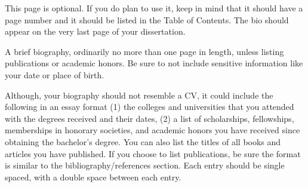 \biography
This page is optional. If you do plan to use it, keep in mind that it should have a page number and it should be listed in the Table of Contents. The bio should appear on the very last page of your dissertation.

A brief biography, ordinarily no more than one page in length, unless listing publications or academic honors.  Be sure to not include sensitive information like your date or place of birth.  

Although, your biography should not resemble a CV, it could include the following in an essay format  (1) the colleges and universities that you attended with the degrees received and their dates, (2) a list of scholarships, fellowships, memberships in honorary societies, and academic honors you have received since obtaining the bachelor’s degree.  You can also list the titles of all books and articles you have published.  If you choose to list publications, be sure the format is similar to the bibliography/references section.  Each entry should be single spaced, with a double space between each entry.